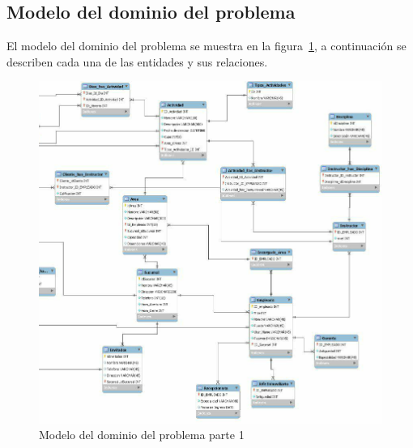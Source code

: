 \subsection{Modelo del dominio del problema}

	El modelo del dominio del problema se muestra en la figura~\ref{fig:modeloDeDominio}, a continuación se describen cada una de las entidades y sus relaciones.
	
\begin{figure}[htbp!]
	\begin{center}
		\includegraphics[angle=90,width=.95\textwidth]{images/modeloDelDominioDelProblema1}
		\caption{Modelo del dominio del problema parte 1}
		\label{fig:modeloDeDominio}
	\end{center}
\end{figure}

